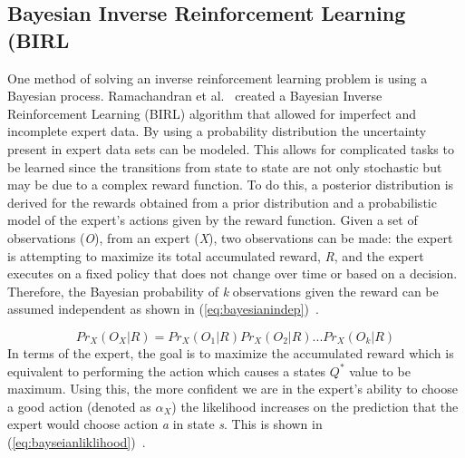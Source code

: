 \documentclass[12pt,american]{report}
\begin{document}
\subsection{Bayesian Inverse Reinforcement Learning (BIRL}
One method of solving an inverse reinforcement learning problem is using a Bayesian process. Ramachandran et al.~\cite{ramachandran2007bayesian} created a Bayesian Inverse Reinforcement Learning (BIRL) algorithm that allowed for imperfect and incomplete expert data.  By using a probability distribution the uncertainty present in expert data sets can be modeled. This allows for complicated tasks to be learned since the transitions from state to state are not only stochastic but may be due to a complex reward function. To do this, a posterior distribution is derived for the rewards obtained from a prior distribution and a probabilistic model of the expert's actions given by the reward function.  Given a set of observations (\textit{O}), from an expert (\textit{X}), two observations can be made: the expert is attempting to maximize its total accumulated reward, \textit{R}, and the expert executes on a fixed policy that does not change over time or based on a decision. Therefore, the Bayesian probability of \textit{k} observations given the reward can be assumed independent as shown in (\ref{eq:bayesianindep})~\cite{ramachandran2007bayesian}.

\begin{equation}
            \label{eq:bayesianindep}
            Pr_X(O_X|R) = Pr_X(O_1|R)Pr_X(O_2|R)...Pr_X(O_k|R)%
        \end{equation}
In terms of the expert, the goal is to maximize the accumulated reward which is equivalent to performing the action which causes a states \textit{$Q^*$} value to be maximum. Using this, the more confident we are in the expert's ability to choose a good action (denoted as $\alpha_X$) the likelihood increases on the prediction that the expert would choose action \textit{a} in state \textit{s}.  This is shown in (\ref{eq:bayseianliklihood})~\cite{ramachandran2007bayesian}.
\end{document}
